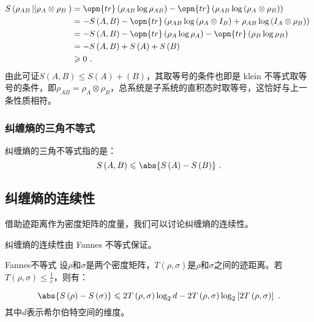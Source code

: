 \begin{equation}
\begin{aligned}
S\left(\rho_{AB}\left|\left|\rho_A\otimes\rho_B\right.\right.\right)&= \opn{tr}\left(\rho_{AB}\log\rho_{AB}\right) - \opn{tr}\left(\rho_{AB}\log\left(\rho_A\otimes\rho_B\right)\right) \\
&= -S\left(A,B\right) - \opn{tr}\left(\rho_{AB}\log\left(\rho_A\otimes I_B\right) + \rho_{AB}\log\left(I_A\otimes\rho_B\right)\right) \\
&= -S\left(A,B\right) - \opn{tr}\left(\rho_A\log\rho_A\right) - \opn{tr}\left(\rho_B\log\rho_B\right) \\
&= -S\left(A,B\right) + S\left(A\right) + S\left(B\right) \\
&\geqslant 0~.
\end{aligned}~
\end{equation}
由此可证$S\left(A,B\right)\leqslant S\left(A\right) + \left(B\right)$，其取等号的条件也即是 klein 不等式取等号的条件，即$\rho_{AB} = \rho_A\otimes \rho_B$，总系统是子系统的直积态时取等号，这恰好与上一条性质相符。

\subsubsection{纠缠熵的三角不等式}

纠缠熵的三角不等式指的是：
\begin{equation}
S\left(A,B\right)\leqslant\abs{S\left(A\right) - S\left(B\right)}~.
\end{equation}


\subsection{纠缠熵的连续性}

借助迹距离作为密度矩阵的度量，我们可以讨论纠缠熵的连续性。

纠缠熵的连续性由 Fannes 不等式保证。

\begin{theorem}{Fannes不等式}
设$\rho$和$\sigma$是两个密度矩阵，$T\left(\rho,\sigma\right)$是$\rho$和$\sigma$之间的迹距离。若$T\left(\rho,\sigma\right) \leqslant \frac{1}{e}$，则有：

\begin{equation}
\abs{S\left(\rho\right) - S\left(\sigma\right)} \leqslant 2T\left(\rho,\sigma\right)\log_2 d - 2T\left(\rho,\sigma\right) \log_2\left[ 2 T\left(\rho,\sigma\right)\right]~.
\end{equation}
其中$d$表示希尔伯特空间的维度。

\end{theorem}

